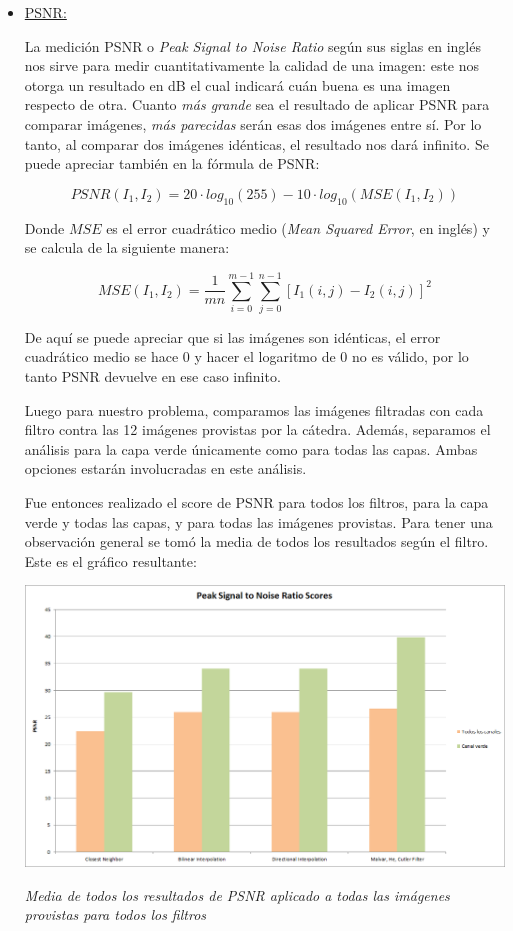 \begin{itemize}
\item \underline{PSNR:} 

La medición PSNR o \textit{Peak Signal to Noise Ratio} según sus siglas en inglés nos sirve para medir cuantitativamente la calidad de una imagen: este nos otorga un resultado en dB el cual indicará cuán buena es una imagen respecto de otra. Cuanto \textit{más grande} sea el resultado de aplicar PSNR para comparar imágenes, \textit{más parecidas} serán esas dos imágenes entre sí. Por lo tanto, al comparar dos imágenes idénticas, el resultado nos dará infinito. Se puede apreciar también en la fórmula de PSNR: 

\[ PSNR(I_1, I_2) = 20 \cdot log_{10}(255) - 10 \cdot log_{10}(MSE(I_1, I_2)) \]

Donde $MSE$ es el error cuadrático medio (\textit{Mean Squared Error}, en inglés) y se calcula de la siguiente manera:

\[ MSE(I_1, I_2) = \dfrac{1}{mn} \sum\limits_{i=0}^{m-1}\sum\limits_{j=0}^{n-1}[I_1(i,j) - I_2(i,j)]^2 \]

De aquí se puede apreciar que si las imágenes son idénticas, el error cuadrático medio se hace 0 y hacer el logaritmo de 0 no es válido, por lo tanto PSNR devuelve en ese caso infinito.


Luego para nuestro problema, comparamos las imágenes filtradas con cada filtro contra las 12 imágenes provistas por la cátedra. Además, separamos el análisis para la capa verde únicamente como para todas las capas. Ambas opciones estarán involucradas en este análisis.

Fue entonces realizado el score de PSNR para todos los filtros, para la capa verde y todas las capas, y para todas las imágenes provistas. Para tener una observación general se tomó la media de todos los resultados según el filtro. Este es el gráfico resultante:

	\begin{center}
		\includegraphics[scale=0.27]{./img/psnrScores.png}
		\vspace{2pt}
		\par
		\footnotesize\textit{Media de todos los resultados de PSNR aplicado a todas las imágenes provistas para todos los filtros}
	\end{center}



\end{itemize}
